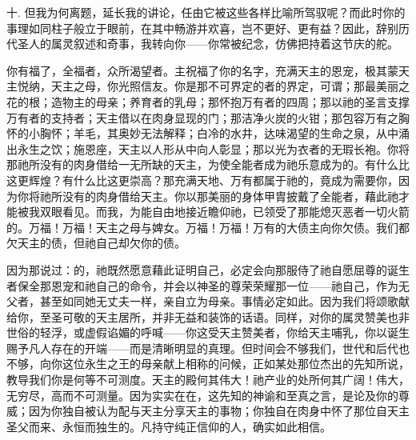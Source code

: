 十. 但我为何离题，延长我的讲论，任由它被这些各样比喻所驾驭呢？而此时你的事理如同柱子般立于眼前，在其中畅游并欢喜，岂不更好、更有益？因此，辞别历代圣人的属灵叙述和奇事，我转向你——你常被纪念，仿佛把持着这节庆的舵。\par

你有福了，全福者，众所渴望者。主祝福了你的名字，充满天主的恩宠，极其蒙天主悦纳，天主之母，你光照信友。你是那不可界定的者的界定，可谓；那最美丽之花的根；造物主的母亲；养育者的乳母；那怀抱万有者的四周；那以祂的圣言支撑万有者的支持者；天主借以在肉身显现的门；那洁净火炭的火钳；那包容万有之胸怀的小胸怀；羊毛，其奥妙无法解释；白冷的水井，达味渴望的生命之泉，从中涌出永生之饮；施恩座，天主以人形从中向人彰显；那以光为衣者的无瑕长袍。你将那祂所没有的肉身借给一无所缺的天主，为使全能者成为祂乐意成为的。有什么比这更辉煌？有什么比这更崇高？那充满天地、万有都属于祂的，竟成为需要你，因为你将祂所没有的肉身借给天主。你以那美丽的身体甲胄披戴了全能者，藉此祂才能被我双眼看见。而我，为能自由地接近瞻仰祂，已领受了那能熄灭恶者一切火箭的。万福！万福！天主之母与婢女。万福！万福！万有的大债主向你欠债。我们都欠天主的债，但祂自己却欠你的债。\par

因为那说过：的，祂既然愿意藉此证明自己，必定会向那服侍了祂自愿屈尊的诞生者保全那恩宠和祂自己的命令，并会以神圣的尊荣荣耀那一位——祂自己，作为无父者，甚至如同她无丈夫一样，亲自立为母亲。事情必定如此。因为我们将颂歌献给你，至圣可敬的天主居所，并非无益和装饰的话语。同样，对你的属灵赞美也非世俗的轻浮，或虚假谄媚的呼喊——你这受天主赞美者，你给天主哺乳，你以诞生赐予凡人存在的开端——而是清晰明显的真理。但时间会不够我们，世代和后代也不够，向你这位永生之王的母亲献上相称的问候，正如某处那位杰出的先知所说，教导我们你是何等不可测度。天主的殿何其伟大！祂产业的处所何其广阔！伟大，无穷尽，高而不可测量。因为实实在在，这先知的神谕和至真之言，是论及你的尊威；因为你独自被认为配与天主分享天主的事物；你独自在肉身中怀了那位自天主圣父而来、永恒而独生的。凡持守纯正信仰的人，确实如此相信。\par

